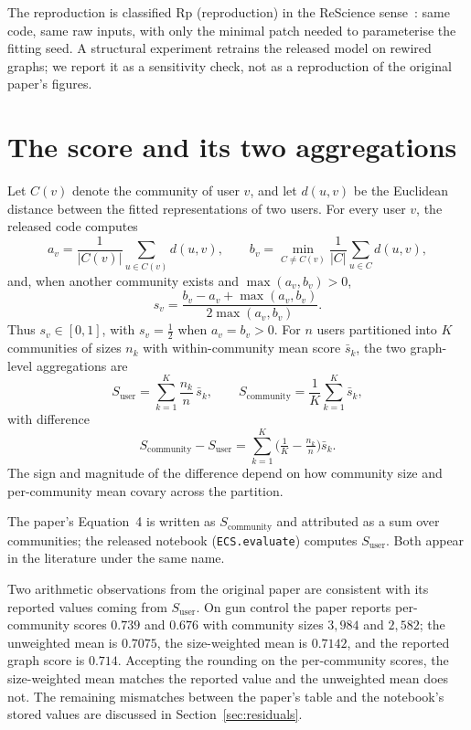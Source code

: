The reproduction is classified Rp (reproduction) in the ReScience sense~\supercite{RougierReScience2017}: same code, same raw inputs, with only the minimal patch needed to parameterise the fitting seed. A structural experiment retrains the released model on rewired graphs; we report it as a sensitivity check, not as a reproduction of the original paper's figures.

\section{The score and its two aggregations}
\label{sec:score}

Let $C(v)$ denote the community of user $v$, and let $d(u,v)$ be the Euclidean distance between the fitted representations of two users. For every user $v$, the released code computes
\[
a_v=\frac{1}{|C(v)|}\sum_{u\in C(v)}d(u,v), \qquad
b_v=\min_{C\ne C(v)}\frac{1}{|C|}\sum_{u\in C}d(u,v),
\]
and, when another community exists and $\max(a_v,b_v)>0$,
\[
s_v=\frac{b_v-a_v+\max(a_v,b_v)}{2\max(a_v,b_v)}.
\]
Thus $s_v\in[0,1]$, with $s_v=\tfrac{1}{2}$ when $a_v=b_v>0$. For $n$ users partitioned into $K$ communities of sizes $n_k$ with within-community mean score $\bar s_k$, the two graph-level aggregations are
\[
S_{\mathrm{user}}=\sum_{k=1}^K \frac{n_k}{n}\,\bar s_k, \qquad
S_{\mathrm{community}}=\frac{1}{K}\sum_{k=1}^K \bar s_k,
\]
with difference
\[
S_{\mathrm{community}}-S_{\mathrm{user}}=\sum_{k=1}^K\!\Big(\tfrac{1}{K}-\tfrac{n_k}{n}\Big)\bar s_k.
\]
The sign and magnitude of the difference depend on how community size and per-community mean covary across the partition.

The paper's Equation~4 is written as $S_{\mathrm{community}}$ and attributed as a sum over communities; the released notebook (\texttt{ECS.evaluate}) computes $S_{\mathrm{user}}$. Both appear in the literature under the same name.

Two arithmetic observations from the original paper are consistent with its reported values coming from $S_{\mathrm{user}}$. On gun control the paper reports per-community scores $0.739$ and $0.676$ with community sizes $3{,}984$ and $2{,}582$; the unweighted mean is $0.7075$, the size-weighted mean is $0.7142$, and the reported graph score is $0.714$. Accepting the rounding on the per-community scores, the size-weighted mean matches the reported value and the unweighted mean does not. The remaining mismatches between the paper's table and the notebook's stored values are discussed in Section~\ref{sec:residuals}.

